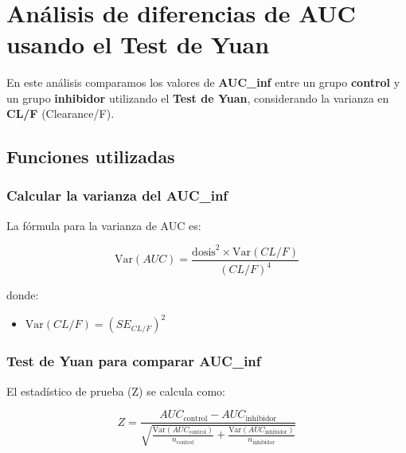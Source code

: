 \documentclass[11pt]{article}
\providecommand{\tightlist}{%
      \setlength{\itemsep}{0pt}\setlength{\parskip}{0pt}}
\begin{document}
    \begin{center}
    \end{center}
    { \hspace*{\fill} \\}
    
    \section{Análisis de diferencias de AUC usando el Test de
Yuan}\label{anuxe1lisis-de-diferencias-de-auc-usando-el-test-de-yuan}

En este análisis comparamos los valores de \textbf{AUC\_inf} entre un
grupo \textbf{control} y un grupo \textbf{inhibidor} utilizando el
\textbf{Test de Yuan}, considerando la varianza en \textbf{CL/F}
(Clearance/F).

\subsection{Funciones utilizadas}\label{funciones-utilizadas}

\subsubsection{Calcular la varianza del
AUC\_inf}\label{calcular-la-varianza-del-auc_inf}

La fórmula para la varianza de AUC es:

\[
\text{Var}(AUC) = \frac{\text{dosis}^2 \times \text{Var}(CL/F)}{(CL/F)^4}
\]

donde:

\begin{itemize}
\tightlist
\item
  \(\text{Var}(CL/F) = (SE_{CL/F})^2\)
\end{itemize}

    \subsubsection{Test de Yuan para comparar
AUC\_inf}\label{test-de-yuan-para-comparar-auc_inf}

El estadístico de prueba (Z) se calcula como:

\[
Z = \frac{AUC_{\text{control}} - AUC_{\text{inhibidor}}}{\sqrt{\frac{\text{Var}(AUC_{\text{control}})}{n_{\text{control}}} + \frac{\text{Var}(AUC_{\text{inhibidor}})}{n_{\text{inhibidor}}}}}
\]
\end{document}
